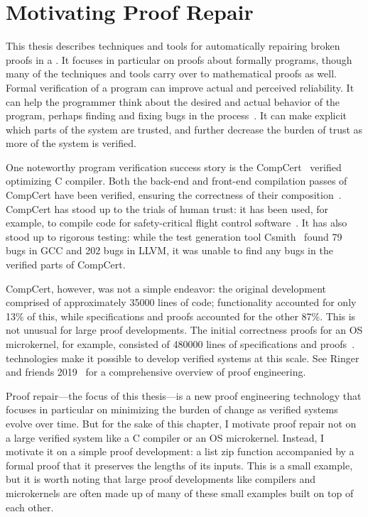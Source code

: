 \chapter{Motivating Proof Repair}
\label{chapt:mot}

This thesis describes techniques and tools for automatically repairing broken proofs in a .
It focuses in particular on proofs about formally  programs, though many of the techniques and tools carry over to mathematical proofs as well.
Formal verification of a program can improve actual and perceived reliability. %
It can help the programmer think about the desired and actual behavior of the program,
perhaps finding and fixing bugs in the process~\cite{murraybp}.
It can make explicit which parts of the system are trusted, and further decrease the burden
of trust as more of the system is verified.

One noteworthy program verification success story is the CompCert~\cite{Leroy:POPL06, Leroy2009} verified optimizing C compiler.
Both the back-end and front-end compilation passes
of CompCert have been verified, ensuring the correctness of their composition~\cite{Kaestner2017}.
CompCert has stood up to the trials of human trust: it has been used, for example, to compile code for safety-critical flight control software~\cite{Frana2011}.
It has also stood up to rigorous testing: while the test generation tool Csmith~\cite{Yang2011} found 
79 bugs in GCC and 202 bugs in LLVM, it was unable to find any bugs in the verified parts of CompCert.

CompCert, however, was not a simple endeavor: the original development comprised of approximately 35000 lines of code;
functionality accounted for only 13\% of this, while specifications and proofs accounted for the other 87\%.
This is not unusual for large proof developments. The initial correctness proofs for an OS microkernel,
for example, consisted of 480000 lines of specifications and proofs~\cite{Klein2014micro}.
 technologies make it possible to develop verified systems at this scale.
See Ringer and friends 2019~\cite{PGL-045} for a comprehensive overview of proof engineering.

Proof repair---the focus of this thesis---is a new proof engineering technology that focuses in particular on minimizing the burden of change as verified systems evolve over time.
But for the sake of this chapter, I motivate proof repair not on a large verified system like a C compiler or an OS microkernel.
Instead, I motivate it on a simple proof development: a list zip function accompanied by a formal proof that it preserves the lengths of its inputs.
This is a small example, but it is worth noting that large proof developments like compilers and microkernels
are often made up of many of these small examples built on top of each other.

